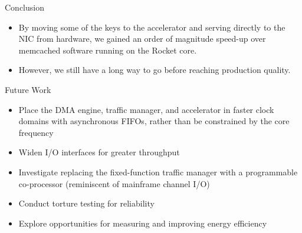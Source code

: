 \begin{block}{Conclusion}
\footnotesize
\begin{itemize}
    \item By moving some of the keys to the accelerator and serving directly
        to the NIC from hardware, we gained an order of magnitude speed-up
        over memcached software running on the Rocket core.
    \item However, we still have a long way to go before reaching
        production quality.
\end{itemize}
\end{block}

\vspace{1ex}

\begin{block}{Future Work}
\footnotesize
\begin{itemize}
    \item Place the DMA engine, traffic manager, and accelerator in
	faster clock domains with asynchronous FIFOs, rather than be
	constrained by the core frequency
    \item Widen I/O interfaces for greater throughput
    \item Investigate replacing the fixed-function traffic manager with
        a programmable co-processor (reminiscent of mainframe channel I/O)
    \item Conduct torture testing for reliability
    \item Explore opportunities for measuring and improving energy efficiency
\end{itemize}
\end{block}
